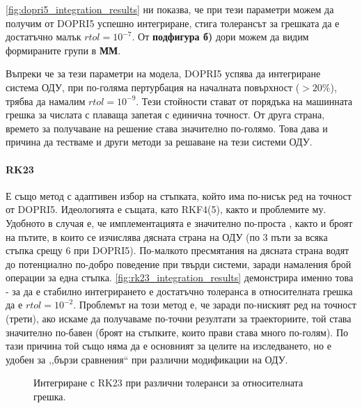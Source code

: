 \autoref{fig:dopri5_integration_results} ни показва, че при тези параметри можем да получим от DOPRI5 успешно интегриране, стига толерансът за грешката да е достатъчно малък $rtol  = 10^{-7}$. От \textbf{подфигура б)} дори можем да видим формираните групи в \textbf{ММ}.

Въпреки че за тези параметри на модела, DOPRI5 успява да интегриране система ОДУ, при по-голяма пертурбация на началната повърхност ($ > 20\%$), трябва да намалим $rtol = 10^{-9}$. Тези стойности стават от порядъка на машинната грешка за числата с плаваща запетая с единична точност. От друга страна, времето за получаване на решение става значително по-голямо. Това дава и причина да тестваме и други методи за решаване на тези системи ОДУ.

\paragraph{RK23} Е също метод с адаптивен избор на стъпката, който има по-нисък ред на точност от DOPRI5. Идеологията е същата, като RKF4(5), както и проблемите му. Удобното в случая е, че имплементацията е значително по-проста \cite{RK23GH}, както и броят на пътите, в които се изчислява дясната страна на ОДУ (по 3 пъти за всяка стъпка срещу 6 при DOPRI5). По-малкото пресмятания на дясната страна водят до потенциално по-добро поведение при твърди системи, заради намаления брой операции за една стъпка. \autoref{fig:rk23_integration_results} демонстрира именно това - за да е стабилно интегрирането е достатъчно толеранса в относителната грешка да е $rtol = 10^{-2}$. Проблемът на този метод е, че заради по-ниският ред на точност (трети), ако искаме да получаваме по-точни резултати за траекториите, той става значително по-бавен (броят на стъпките, които прави става много по-голям). По тази причина той също няма да е основният за целите на изследването, но е удобен за ,,бързи сравнения`` при различни модификации на ОДУ.
\begin{figure}[hbpt]
    \centering
    \caption{Интегриране с RK23 при различни толеранси за относителната грешка.}
    \label{fig:rk23_integration_results}
\end{figure}

